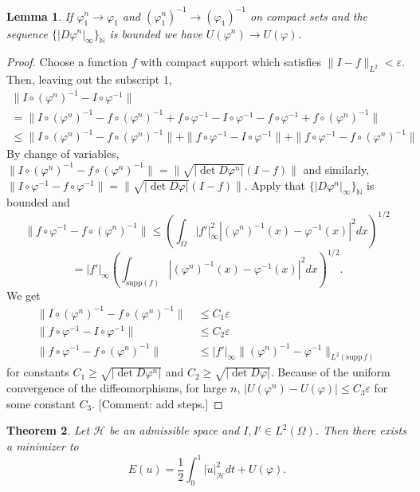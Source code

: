 \documentclass{article}
\theoremstyle{plain}
\newtheorem{teo}{Theorem}[section]
\newtheorem{lem}[teo]{Lemma}
\theoremstyle{definition}
\numberwithin{equation}{section}
\newcommand{\N}{\ensuremath{\mathbb{N}}}
\begin{document}
\begin{lem}
\label{lem:impliesweak}
If $\varphi_1^n\to \varphi_1$ and $(\varphi_1^n)^{-1}\to (\varphi_1)^{-1}$ on compact sets and the sequence $\{|D\varphi^n|_\infty\}_\N$ is bounded we have $U(\varphi^n)\to U(\varphi)$.
\end{lem}
\begin{proof}
Choose a function $f$ with compact support which satisfies $\|I-f\|_{L^2}<\varepsilon$. Then, leaving out the subscript $1$,
%
\begin{multline*}
\|I\circ (\varphi^n)^{-1} - I\circ \varphi^{-1}\|\\
=\|I\circ (\varphi^n)^{-1}- f\circ(\varphi^n)^{-1}+f\circ \varphi^{-1}- I\circ \varphi^{-1} -f\circ \varphi^{-1}+f\circ(\varphi^n)^{-1}\|\\
\leq \|I\circ (\varphi^n)^{-1}- f\circ(\varphi^n)^{-1}\|+\|f\circ \varphi^{-1}- I\circ \varphi^{-1}\|+\|f\circ \varphi^{-1}-f\circ(\varphi^n)^{-1}\|
\end{multline*}
%
By change of variables, $\|I\circ (\varphi^n)^{-1}- f\circ(\varphi^n)^{-1}\|=\|\sqrt{|\det D\varphi^n|}(I-f)\|$ and similarly, $\|I\circ \varphi^{-1}-f\circ\varphi^{-1}\|=\|\sqrt{|\det D\varphi|}(I-f)\|$. Apply that $\{|D\varphi^n|_\infty\}_\N$ is bounded and
\[
\|f\circ \varphi^{-1}-f\circ(\varphi^n)^{-1}\|\leq \left(\int_\Omega |f'|^2_\infty|(\varphi^n)^{-1}(x)-\varphi^{-1}(x)|^2dx\right)^{1/2}
\]
\[
=|f'|_\infty\left(\int_{\mathrm{supp}(f)} |(\varphi^n)^{-1}(x)-\varphi^{-1}(x)|^2dx\right)^{1/2}.
\]
We get
%
\begin{align*}
\|I\circ (\varphi^n)^{-1}- f\circ(\varphi^n)^{-1}\|&\ \leq C_1 \varepsilon \\
\|f\circ \varphi^{-1}- I\circ \varphi^{-1}\| &\ \leq C_2 \varepsilon \\
\|f\circ \varphi^{-1}-f\circ(\varphi^n)^{-1}\|&\ \leq |f'|_\infty\|(\varphi^n)^{-1}-\varphi^{-1}\|_{L^2(\mathrm{supp}\,f)} 
\end{align*}
%
for constants $C_1\geq \sqrt{|\det D\varphi^n|}$ and $C_2\geq \sqrt{|\det D\varphi|}$. Because of the uniform convergence of the diffeomorphisms, for large $n$, $|U(\varphi^n)-U(\varphi)|\leq C_3\varepsilon$ for some constant $C_3$. [Comment: add steps.]
\end{proof}

\begin{teo}
Let $\mathcal H$ be an admissible space  and $I,I'\in L^2(\Omega)$. Then there exists a minimizer to
\[
E(u)=\frac{1}{2}\int_0^1 |\dot{u}|_{\mathcal H}^2 dt + U(\varphi).
\]
\end{teo}
\end{document}
